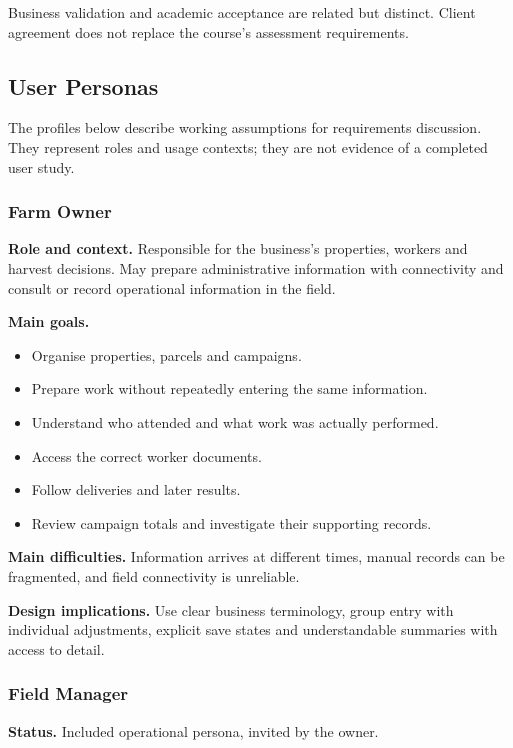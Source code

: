 Business validation and academic acceptance
are related but distinct.
Client agreement does not replace
the course's assessment requirements.

\subsection{User Personas}

The profiles below describe working assumptions
for requirements discussion.
They represent roles and usage contexts;
they are not evidence of a completed user study.

\subsubsection{Farm Owner}

\textbf{Role and context.}
Responsible for the business's properties,
workers and harvest decisions.
May prepare administrative information
with connectivity and consult or record
operational information in the field.

\textbf{Main goals.}
\begin{itemize}
    \item Organise properties, parcels and campaigns.
    \item Prepare work without repeatedly
    entering the same information.
    \item Understand who attended
    and what work was actually performed.
    \item Access the correct worker documents.
    \item Follow deliveries and later results.
    \item Review campaign totals
    and investigate their supporting records.
\end{itemize}

\textbf{Main difficulties.}
Information arrives at different times,
manual records can be fragmented,
and field connectivity is unreliable.

\textbf{Design implications.}
Use clear business terminology,
group entry with individual adjustments,
explicit save states and understandable
summaries with access to detail.

\subsubsection{Field Manager}

\textbf{Status.}
Included operational persona, invited by the owner.

